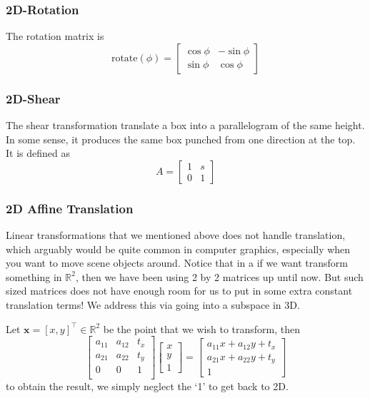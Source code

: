 \documentclass[11pt]{article}
\newcommand{\bx}{\mathbf{x}}
\newcommand{\real}{\mathbb{R}}
\begin{document}
\subsubsection{2D-Rotation}
The rotation matrix is 
\begin{equation}
	\text{rotate}(\phi) = \begin{bmatrix}
		\cos \phi & - \sin \phi \\
		\sin \phi & \cos \phi
	\end{bmatrix}
\end{equation}

\subsubsection{2D-Shear}
The shear transformation translate a box into a parallelogram of the same height. In some sense, it produces the same box punched from one direction at the top. It is defined as 
\begin{equation}
	A = \begin{bmatrix}
		1 & s \\
		0 & 1
	\end{bmatrix}
\end{equation}

\subsubsection{2D Affine Translation\label{sec:2daffine}}
Linear transformations that we mentioned above does not handle translation, which arguably would be quite common in computer graphics, especially when you want to move scene objects around. Notice that in a if we want transform something in $\real^2$, then we have been using 2 by 2 matrices up until now. But such sized matrices does not have enough room for us to put in some extra constant translation terms! We address this via going into a subspace in 3D. 

Let $\bx = [x, y]^\top \in \real^2$ be the point that we wish to transform, then 
\begin{equation}
	\begin{bmatrix}
		a_{11} & a_{12} & t_x \\
		a_{21} & a_{22} & t_y \\
		0      & 0      & 1 \\
	\end{bmatrix} \begin{bmatrix}
		x \\ y \\ 1
	\end{bmatrix} = \begin{bmatrix}
		a_{11}x + a_{12}y + t_x \\
		a_{21}x + a_{22}y + t_y \\
		1
	\end{bmatrix}
\end{equation}
to obtain the result, we simply neglect the `1' to get back to 2D. 
\end{document}
